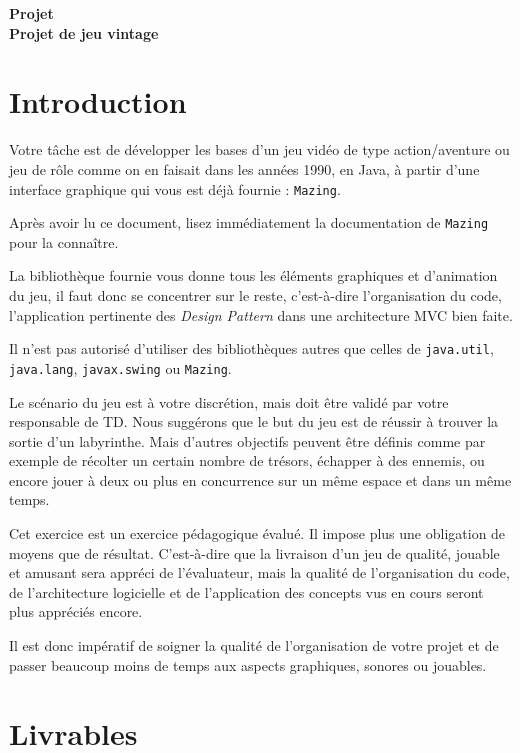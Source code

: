 \documentclass{article}
\newcommand{\bigtext}{\fontsize{16pt}{20pt}\selectfont}
\newcommand{\code}[1]{\lstinline{#1}}
\newcommand{\PROJECTheader}[1]{
    \begin{tcolorbox}[colback=gray!10!white, colframe=gray!80!black, width=\textwidth, sharp corners]
        \centering
        \vspace{0.2cm}
        \textbf{\Large Projet} \\
        \textbf{#1}
    \end{tcolorbox}
}
\begin{document}
\bigtext

\PROJECTheader{Projet de jeu vintage}




\section*{Introduction}

Votre tâche est de développer les bases d'un jeu vidéo de type action/aventure ou jeu de rôle comme on en faisait dans les 
années 1990, en Java, à partir d'une interface graphique qui vous est déjà fournie : \texttt{Mazing}.

Après avoir lu ce document, lisez immédiatement la documentation de \texttt{Mazing} pour la connaître.

La bibliothèque fournie vous donne tous les éléments graphiques et d'animation du jeu, il faut donc se concentrer sur le reste, 
c'est-à-dire l'organisation du code, l'application pertinente des \textit{Design Pattern} dans une architecture MVC bien faite.

Il n'est pas autorisé d'utiliser des bibliothèques autres que celles de \code{java.util}, \code{java.lang}, \code{javax.swing} ou \code{Mazing}.

Le scénario du jeu est à votre discrétion, mais doit être validé par votre responsable de TD. 
Nous suggérons que le but du jeu est de réussir à trouver la sortie d'un labyrinthe. 
Mais d'autres objectifs peuvent être définis comme par exemple de récolter un certain nombre de trésors, échapper à des ennemis, ou encore jouer à deux ou plus en concurrence sur un même espace et dans un même temps.

Cet exercice est un exercice pédagogique évalué. Il impose plus une obligation de moyens que de résultat. C'est-à-dire que
la livraison d'un jeu de qualité, jouable et amusant sera appréci de l'évaluateur, mais la qualité de l'organisation du code, 
de l'architecture logicielle et de l'application des concepts vus en cours seront plus appréciés encore.

Il est donc impératif de soigner la qualité de l'organisation de votre projet et de passer beaucoup moins de temps 
aux aspects graphiques, sonores ou jouables.

\section*{Livrables}
\end{document}
